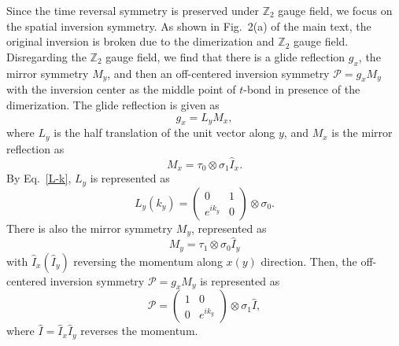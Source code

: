 \documentclass[aps,prl,twocolumn,noshowpacs,superscriptaddress]{revtex4-1}
\def \Z {\mathbb{Z}}
\begin{document}
Since the time reversal symmetry is preserved under $ \Z_2 $ gauge field, we focus on the spatial inversion symmetry. As shown in Fig.~2(a) of the main text, the original inversion is broken due to the dimerization and $ \Z_2 $ gauge field. Disregarding the $ \Z_2 $ gauge field, we find that there is a glide reflection $ g_x $, the mirror symmetry $ M_y $, and then an off-centered inversion symmetry $ \mathcal{P}=g_xM_y $ with the inversion center as the middle point of $ t $-bond in presence of the dimerization. The glide reflection is given as
\begin{equation}
	g_x=L_yM_x,
\end{equation}
where $ L_y $ is the half translation of the unit vector along $ y $, and $ M_x $ is the mirror reflection as
\begin{equation}
	M_x=\tau_0\otimes\sigma_1\hat{I}_x.
\end{equation}
By Eq.~\eqref{L-k}, $ L_y $ is represented as
\begin{equation}\label{Ly-k}
	L_y(k_y)=\begin{pmatrix}
		0 & 1 \\ e^{ik_y} & 0
	\end{pmatrix}\otimes \sigma_0.
\end{equation}
There is also the mirror symmetry $ M_y $, represented as
\begin{equation}\label{Mxy}
	M_y=\tau_1\otimes\sigma_0\hat{I}_y
\end{equation}
with $ \hat{I}_x( \hat{I}_y )  $ reversing the momentum along $ x(y) $ direction. Then, the off-centered inversion symmetry $ \mathcal{P}=g_xM_y $ is represented as
\begin{equation}
	\mathcal{P}=\begin{pmatrix}
		1 & 0 \\ 0 & e^{ik_y}
	\end{pmatrix}\otimes\sigma_1 \hat{I}, 
\end{equation}
where $\hat{I}=\hat{I}_{x}\hat{I}_{y} $ reverses the momentum. 
\end{document}
